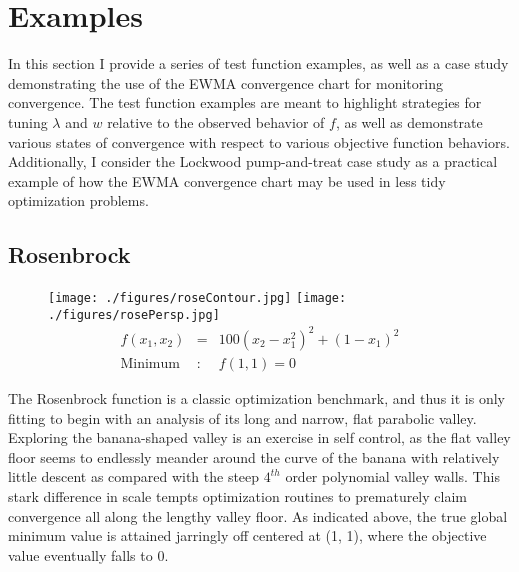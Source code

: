 \documentclass[12pt]{article}
\begin{document}
	
%
%
\section{Examples}
%
%

In this section I provide a series of test function examples, as well as a case study demonstrating the use of the EWMA convergence chart for monitoring convergence.
The test function examples are meant to highlight strategies for tuning $\lambda$ and $w$ relative to the observed behavior of $f$, as well as demonstrate various states of convergence with respect to various objective function behaviors.
%
Additionally, I consider the Lockwood pump-and-treat case study as a practical example of how the EWMA convergence chart may be used in less tidy optimization problems.
	
	\clearpage
	\subsection{Rosenbrock}
	
	\begin{figure}[!h]%
	\centering
	\texttt{[image: ./figures/roseContour.jpg]}
	\texttt{[image: ./figures/rosePersp.jpg]}
	\begin{eqnarray}
	f(x_1, x_2) &=& 100\left(x_2-x_1^2\right)^2 + (1-x_1)^2 \\
	\text{Minimum}&:& f(1, 1)=0\nonumber
	\end{eqnarray}	
	\end{figure}
	
	The Rosenbrock function \cite{rosePaper} is a classic optimization benchmark, and thus it is only fitting to begin with an analysis of its long and narrow, flat parabolic valley.
	Exploring the banana-shaped valley is an exercise in self control, as the flat valley floor seems to endlessly meander around the curve of the banana with relatively little descent as compared with the steep $4^{th}$ order polynomial valley walls.   
	This stark difference in scale tempts optimization routines to prematurely claim convergence all along the lengthy valley floor. 
	As indicated above, the true global minimum value is attained jarringly off centered at (1, 1), where the objective value eventually falls to 0. 
	
\end{document}
